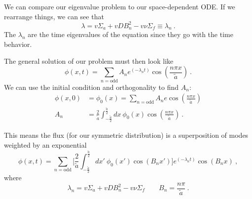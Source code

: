 \documentclass[12pt]{article}
\begin{document}
We can compare our eigenvalue problem to our space-dependent ODE. If we rearrange things, we can see that 
\[
\lambda = v \Sigma_a + v D B_n^2 - v \nu \Sigma_f \equiv \lambda_n \:.
\]
The $\lambda_n$ are the time eigenvalues of the equation since they go with the time behavior. 

The general solution of our problem must then look like
\[
\phi(x,t) = \sum_{n=\text{odd}} A_n e^(-\lambda_n t) \cos(\frac{n \pi x}{\tilde{a}}) \:.
\]
We can use the initial condition and orthogonality to find $A_n$:
\begin{align*}
\phi(x,0) &= \phi_0(x) = \sum_{n=\text{odd}} A_n e\cos(\frac{n \pi x}{\tilde{a}})\\
%
A_n &= \frac{2}{\tilde{a}}\int_{-\frac{\tilde{a}}{2}}^{\frac{\tilde{a}}{2}} dx\: \phi_0(x) \cos(\frac{n \pi x}{\tilde{a}}) \:.
\end{align*}

This means the flux (for our symmetric distribution) is a superposition of modes weighted by an exponential
\[
\phi(x,t) = \sum_{n=\text{odd}} \bigl[\frac{2}{\tilde{a}}\int_{-\frac{\tilde{a}}{2}}^{\frac{\tilde{a}}{2}} dx'\: \phi_0(x') \cos(B_n x')\bigr] e^(-\lambda_n t) \cos(B_nx) \:,
\]
where
\[
\lambda_n = v \Sigma_a + v D B_n^2 - v \nu \Sigma_f \qquad B_n = \frac{n \pi}{\tilde{a}} \:.
\]
\end{document}
